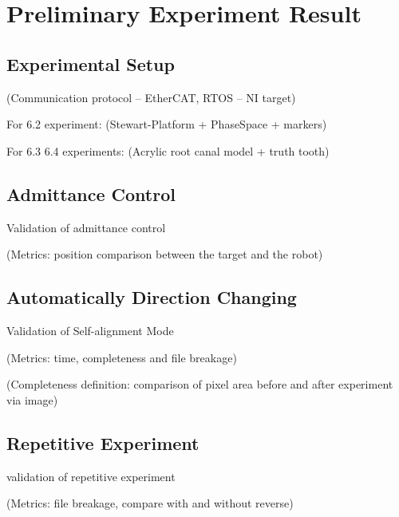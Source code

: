 \chapter{Preliminary Experiment Result}
\section{Experimental Setup}
(Communication protocol – EtherCAT, RTOS – NI target)						
\par\noindent
For 6.2 experiment: (Stewart-Platform + PhaseSpace + markers)				
\par\noindent
For 6.3 6.4 experiments: (Acrylic root canal model + truth tooth)
\section{Admittance Control}
Validation of admittance control
\par\noindent
(Metrics: position comparison between the target and the robot)
\section{Automatically Direction Changing}
Validation of Self-alignment Mode
\par\noindent
(Metrics: time, completeness and file breakage)								
\par\noindent
(Completeness definition: comparison of pixel area before and after experiment via image)
\section{Repetitive Experiment}
validation of repetitive experiment
\par\noindent
(Metrics: file breakage, compare with and without reverse)